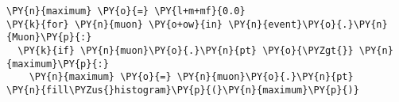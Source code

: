 \begin{Verbatim}[commandchars=\\\{\}]
\PY{n}{maximum} \PY{o}{=} \PY{l+m+mf}{0.0}
\PY{k}{for} \PY{n}{muon} \PY{o+ow}{in} \PY{n}{event}\PY{o}{.}\PY{n}{Muon}\PY{p}{:}
  \PY{k}{if} \PY{n}{muon}\PY{o}{.}\PY{n}{pt} \PY{o}{\PYZgt{}} \PY{n}{maximum}\PY{p}{:}
    \PY{n}{maximum} \PY{o}{=} \PY{n}{muon}\PY{o}{.}\PY{n}{pt}
\PY{n}{fill\PYZus{}histogram}\PY{p}{(}\PY{n}{maximum}\PY{p}{)}
\end{Verbatim}
